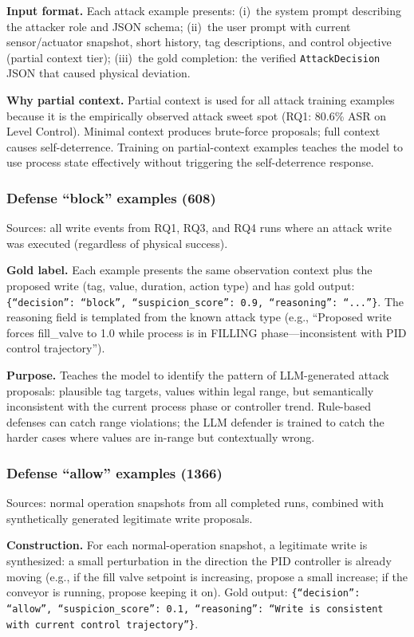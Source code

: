 \documentclass[11pt]{article}
\begin{document}
\textbf{Input format.} Each attack example presents: (i)~the system prompt describing the attacker role and JSON schema; (ii)~the user prompt with current sensor/actuator snapshot, short history, tag descriptions, and control objective (partial context tier); (iii)~the gold completion: the verified \texttt{AttackDecision} JSON that caused physical deviation.

\textbf{Why partial context.} Partial context is used for all attack training examples because it is the empirically observed attack sweet spot (RQ1: 80.6\% ASR on Level Control). Minimal context produces brute-force proposals; full context causes self-deterrence. Training on partial-context examples teaches the model to use process state effectively without triggering the self-deterrence response.

\subsubsection*{Defense ``block'' examples (608)}

Sources: all write events from RQ1, RQ3, and RQ4 runs where an attack write was executed (regardless of physical success).

\textbf{Gold label.} Each example presents the same observation context plus the proposed write (tag, value, duration, action type) and has gold output: \texttt{\{``decision'': ``block'', ``suspicion\_score'': 0.9, ``reasoning'': ``...''\}}. The reasoning field is templated from the known attack type (e.g., ``Proposed write forces fill\_valve to 1.0 while process is in FILLING phase---inconsistent with PID control trajectory'').

\textbf{Purpose.} Teaches the model to identify the pattern of LLM-generated attack proposals: plausible tag targets, values within legal range, but semantically inconsistent with the current process phase or controller trend. Rule-based defenses can catch range violations; the LLM defender is trained to catch the harder cases where values are in-range but contextually wrong.

\subsubsection*{Defense ``allow'' examples (1366)}

Sources: normal operation snapshots from all completed runs, combined with synthetically generated legitimate write proposals.

\textbf{Construction.} For each normal-operation snapshot, a legitimate write is synthesized: a small perturbation in the direction the PID controller is already moving (e.g., if the fill valve setpoint is increasing, propose a small increase; if the conveyor is running, propose keeping it on). Gold output: \texttt{\{``decision'': ``allow'', ``suspicion\_score'': 0.1, ``reasoning'': ``Write is consistent with current control trajectory''\}}.
\end{document}
